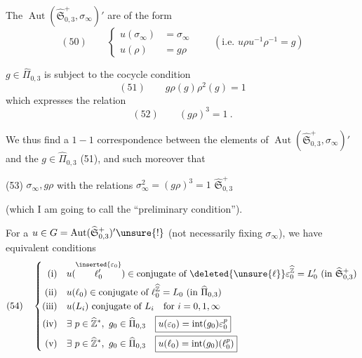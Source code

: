 
The \unsure{$\in$}  $\operatorname{Aut}(\widehat{\mathfrak S}_{0,3}^{+},\sigma_\infty)'$ are of the form
\[
(50)\qquad
\left\{\begin{aligned}
u(\sigma_\infty)&=\sigma_\infty\\
u(\rho)&=g\rho
\end{aligned}\right.
\qquad (\text{i.e. }u\rho u^{-1}\rho^{-1}=g)
\]


$g\in\widehat{\Pi}_{0,3}$  is subject to the cocycle condition
\[
(51)\qquad \boxed{g\rho(g)\rho^2(g)=1}
\]
which expresses the relation
\[
(52)\qquad (g\rho)^3=1\ .
\]

We thus find a $1-1$ correspondence between the elements of $\operatorname{Aut}(\widehat{\mathfrak S}_{0,3}^{+},\sigma_\infty)'$ and the $g\in\widehat{\Pi}_{0,3}$  (51), and such moreover that

(53) $\sigma_\infty,g\rho$ with the relations $\sigma_\infty^2=(g\rho)^3=1$  $\widehat{\mathfrak S}_{0,3}^{+}$


(which I am going to call the ``preliminary condition'').


For a $u\in G=\operatorname{Aut}(\widehat{\mathfrak S}_{0,3}^{+})'\unsure{!}$ (not necessarily fixing $\sigma_\infty$), we have equivalent conditions
\[
(54)\quad
\left\{\begin{aligned}
\text{(i)}\quad &u(\overset{\inserted{\varepsilon_0}}{\ell'_0})\in\text{conjugate of }\deleted{\unsure{\ell}}\varepsilon_0^{\widehat{\mathbb Z}}=L'_0\ (\text{in }\widehat{\mathfrak S}_{0,3}^{+})\\
\text{(ii)}\quad &u(\ell_0)\in\text{conjugate of }\ell_0^{\widehat{\mathbb Z}}=L_0\ (\text{in }\widehat{\Pi}_{0,3})\\
\text{(iii)}\quad &u(L_i)\text{ conjugate of }L_i\quad\text{for }i=0,1,\infty\\
\text{(iv)}\quad &\exists\ p\in\widehat{\mathbb Z}^{\ast},\ g_0\in\widehat{\Pi}_{0,3}\quad
\boxed{u(\varepsilon_0)=\operatorname{int}(g_0)\varepsilon_0^p}\\
\text{(v)}\quad &\exists\ p\in\widehat{\mathbb Z}^{\ast},\ g_0\in\widehat{\Pi}_{0,3}\quad
\boxed{u(\ell_0)=\operatorname{int}(g_0)(\ell_0^p)}
\end{aligned}\right.
\]


